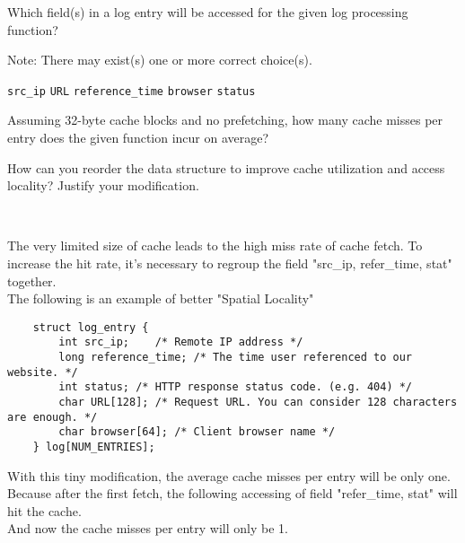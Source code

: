 \begin{questions}

\question[2] Which field(s) in a log entry will be accessed for the
given log processing function?

{
    \begin{solution}
        Note: There may exist(s) one or more correct choice(s).\\
        \begin{oneparcheckboxes}
            \CorrectChoice \texttt{src\_ip}
            \choice \texttt{URL}
            \CorrectChoice \texttt{reference\_time}
            \choice \texttt{browser}
            \CorrectChoice \texttt{status}
        \end{oneparcheckboxes}
    \end{solution}
}

\question[1] Assuming 32-byte cache blocks and no prefetching, how
many cache misses per entry does the given function incur on average? \label{q:miss}

{
    \begin{solution}
    \end{solution}
}

\question[3] How can you reorder the data structure to improve
cache utilization and access locality? Justify your modification.

{
    \begin{solution}
    \\
    \vspace{.1cm}
    
    The very limited size of cache leads to the high miss rate of cache fetch. To increase the hit rate, it's necessary to regroup the field "src\_ip, refer\_time, stat" together.\\
    The following is an example of better "Spatial Locality"
    \begin{verbatim}
    struct log_entry {
        int src_ip;    /* Remote IP address */
        long reference_time; /* The time user referenced to our website. */
        int status; /* HTTP response status code. (e.g. 404) */
        char URL[128]; /* Request URL. You can consider 128 characters are enough. */
        char browser[64]; /* Client browser name */
    } log[NUM_ENTRIES];
\end{verbatim}
With this tiny modification, the average cache misses per entry will be only one. Because after the first fetch, the following accessing of field "refer\_time, stat" will hit the cache.\\
And now the cache misses per entry will only be 1.
        \vspace{.5in}
    \end{solution}
}


\end{questions}
